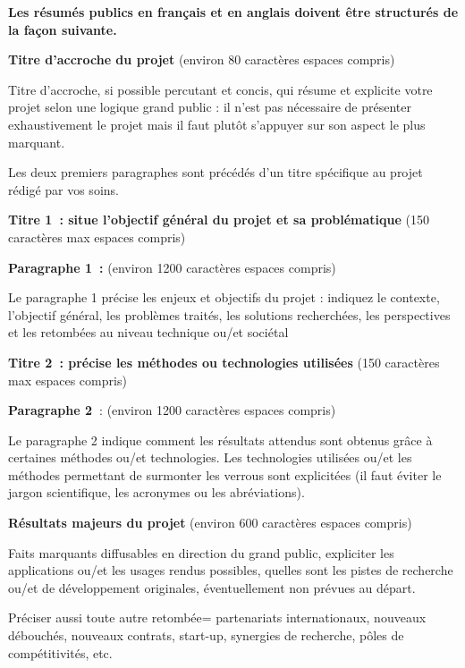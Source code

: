 \documentclass[a4paper,11pt]{article}
\newcommand{\instructions}[1]{%
		{%
			\setlength{\parindent}{0cm}%
			{\em\color{ANRvert}#1}%
		}%
	}
\newcommand{\instructions}[1]{}
\begin{document}
\instructions{%

\textbf{Les résumés publics en français et en anglais doivent être structurés de la façon suivante.}

\bigskip

\textbf{Titre d'accroche du projet} (environ 80 caractères espaces compris)

Titre d'accroche, si possible percutant et concis, qui  résume et explicite votre projet selon une logique grand public : il n'est pas nécessaire de présenter exhaustivement le projet mais il faut plutôt s'appuyer sur son aspect le plus marquant. 

\bigskip

Les deux premiers paragraphes sont précédés d'un titre spécifique au projet rédigé par vos soins.

\bigskip

\textbf{Titre 1~: situe l'objectif  général du projet et sa problématique} (150 caractères max espaces compris)

\textbf{Paragraphe 1~:} (environ 1200 caractères espaces compris)

Le paragraphe 1 précise les enjeux et objectifs du projet : indiquez le contexte, l'objectif général, les problèmes traités, les solutions recherchées, les perspectives et les retombées au niveau technique ou/et sociétal


\bigskip
\bigskip


\textbf{Titre 2~: précise les méthodes ou technologies utilisées} (150 caractères max espaces compris)

\textbf{Paragraphe 2~}: (environ 1200 caractères espaces compris)

Le paragraphe 2 indique comment les résultats attendus sont obtenus grâce à certaines méthodes ou/et technologies. Les technologies utilisées ou/et les méthodes permettant de surmonter les verrous sont explicitées (il faut éviter le jargon scientifique, les acronymes ou les abréviations).

\bigskip

\textbf{Résultats majeurs du projet} (environ 600 caractères espaces compris)

Faits marquants diffusables en direction du grand public, expliciter les applications ou/et les usages rendus possibles, quelles sont les pistes de recherche ou/et de développement originales, éventuellement non prévues au départ.

Préciser aussi toute autre retombée= partenariats internationaux, nouveaux débouchés, nouveaux contrats, start-up, synergies de recherche, pôles de compétitivités, etc.

}
\end{document}
